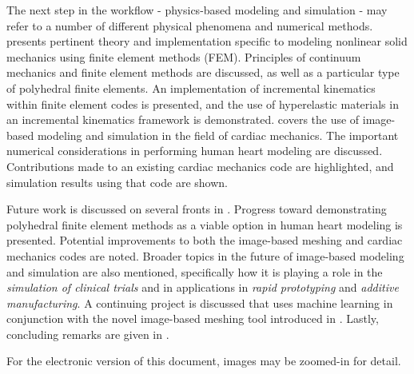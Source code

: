 The next step in the workflow - physics-based modeling and simulation - may refer to a number of different physical phenomena and numerical methods.  presents pertinent theory and implementation specific to modeling nonlinear solid mechanics using finite element methods (FEM). Principles of continuum mechanics and finite element methods are discussed, as well as a particular type of polyhedral finite elements. An implementation of incremental kinematics within finite element codes is presented, and the use of hyperelastic materials in an incremental kinematics framework is demonstrated.  covers the use of image-based modeling and simulation in the field of cardiac mechanics. The important numerical considerations in performing human heart modeling are discussed. Contributions made to an existing cardiac mechanics code are highlighted, and simulation results using that code are shown.

Future work is discussed on several fronts in . Progress toward demonstrating polyhedral finite element methods as a viable option in human heart modeling is presented. Potential improvements to both the image-based meshing and cardiac mechanics codes are noted. Broader topics in the future of image-based modeling and simulation are also mentioned, specifically how it is playing a role in the \textit{simulation of clinical trials} and in applications in \textit{rapid prototyping} and \textit{additive manufacturing}. A continuing project is discussed that uses machine learning in conjunction with the novel image-based meshing tool introduced in . Lastly, concluding remarks are given in .

For the electronic version of this document, images may be zoomed-in for detail.
